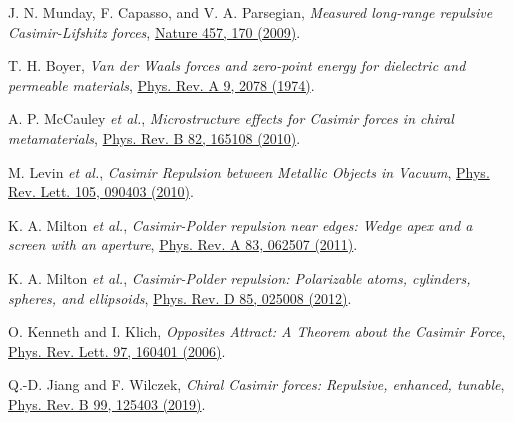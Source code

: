 \documentclass[a4paper, 12pt]{article}
\def\bibauthor#1{#1} %
\def\bibtitle#1{\textit{#1}} %
\begin{document}
\begin{thebibliography}{99}
	\bibauthor{J. N. Munday, F. Capasso, and V. A. Parsegian}, 
	\bibtitle{Measured long-range repulsive Casimir-Lifshitz forces}, 
	\href{http://dx.doi.org/10.1038/nature07610}{Nature 457, 170 (2009)}.

	\bibauthor{T. H. Boyer}, 
	\bibtitle{Van der Waals forces and zero-point energy for dielectric and permeable materials}, 
	\href{http://dx.doi.org/10.1103/PhysRevA.9.2078}{Phys. Rev. A 9, 2078 (1974)}.

	\bibauthor{A. P. McCauley \textit{et al.}}, 
	\bibtitle{Microstructure effects for Casimir forces in chiral metamaterials}, 
	\href{http://dx.doi.org/10.1103/PhysRevB.82.165108}{Phys. Rev. B 82, 165108 (2010)}.

	\bibauthor{M. Levin \textit{et al.}}, 
	\bibtitle{Casimir Repulsion between Metallic Objects in Vacuum}, 
	\href{http://dx.doi.org/10.1103/PhysRevLett.105.090403}{Phys. Rev. Lett. 105, 090403 (2010)}.

	\bibauthor{K. A. Milton \textit{et al.}}, 
	\bibtitle{Casimir-Polder repulsion near edges: Wedge apex and a screen with an aperture}, 
	\href{http://dx.doi.org/10.1103/PhysRevA.83.062507}{Phys. Rev. A 83, 062507 (2011)}.

	\bibauthor{K. A. Milton \textit{et al.}}, 
	\bibtitle{Casimir-Polder repulsion: Polarizable atoms, cylinders, spheres, and ellipsoids}, 
	\href{http://dx.doi.org/10.1103/PhysRevD.85.025008}{Phys. Rev. D 85, 025008 (2012)}.

	\bibauthor{O. Kenneth and I. Klich}, 
	\bibtitle{Opposites Attract: A Theorem about the Casimir Force}, 
	\href{http://dx.doi.org/10.1103/PhysRevLett.97.160401}{Phys. Rev. Lett. 97, 160401 (2006)}.

	\bibauthor{Q.-D. Jiang and F. Wilczek}, 
	\bibtitle{Chiral Casimir forces: Repulsive, enhanced, tunable},
	\href{http://dx.doi.org/10.1103/PhysRevB.99.125403}{Phys. Rev. B 99, 125403 (2019)}.
\end{thebibliography}
\end{document}
